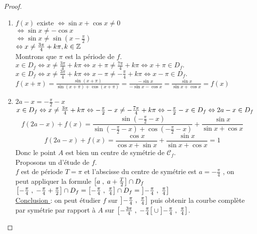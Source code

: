 \begin{proof}
\begin{enumerate}
\item $ f(x) $ existe    $\Leftrightarrow \sin x+\cos x \neq 0  $\\
 $\Leftrightarrow \sin x \neq -\cos x $\\
 $\Leftrightarrow \sin x \neq \sin (x- \frac{\pi}{2}) $\\
 $ \Leftrightarrow x\neq \frac{3\pi}{4}+ k\pi , k\in \mathbb{Z}$\\
 Montrons que $ \pi $ est la période de $ f. $\\
 $ x \in D_{f}\Leftrightarrow x\neq \frac{3\pi}{4}+ k\pi \Leftrightarrow x+\pi\neq \frac{7\pi}{4}+ k\pi \Leftrightarrow x+\pi\in D_{f}.$\\
  $ x \in D_{f}\Leftrightarrow x\neq \frac{3\pi}{4}+ k\pi \Leftrightarrow x-\pi\neq -\frac{\pi}{4}+ k\pi \Leftrightarrow x-\pi\in D_{f}.$\\
 $ f(x+\pi)=\frac{\sin (x+\pi) }{\sin (x+\pi)+\cos (x+\pi)}= \frac{-\sin x }{-\sin x-\cos x}=\frac{\sin x }{\sin x+\cos x}=f(x)$
 \item $ 2a-x=-\frac{\pi}{2}-x $\\
  $ x \in D_{f}\Leftrightarrow x\neq \frac{3\pi}{4}+ k\pi \Leftrightarrow -\frac{\pi}{2}-x \neq -\frac{7\pi}{4}+ k\pi \Leftrightarrow -\frac{\pi}{2}-x\in D_{f} \\\Leftrightarrow 2a-x\in D_{f}$
 $$ f(2a-x)+f(x)= \frac{\sin (-\frac{\pi}{2}-x ) }{\sin (-\frac{\pi}{2}-x )+\cos (-\frac{\pi}{2}-x )}+\frac{\sin x }{\sin x+\cos x} $$
 $$ f(2a-x)+f(x)= \frac{\cos x }{\cos x +\sin x }+\frac{\sin x }{\sin x+\cos x}=1 $$
 Donc le point $ A $ est bien un centre de symétrie de $ \mathcal{C}_{f} $.\\
 Proposons un d'étude   de $f. $\\
$ f $ est de période $ T= \pi$ et l'abscisse  du centre de symétrie est $ a=-\frac{\pi}{4}  $ , on peut appliquer la formule $ \left[a\;,\; a+\frac{T}{2}\right]\cap D_{f} $ \\
$ \left[-\frac{\pi}{4}\;,\; -\frac{\pi}{4}+\frac{\pi}{2}\right]\cap D_{f} =\left[-\frac{\pi}{4}\;,\; \frac{\pi}{4}\right]\cap D_{f}=\left]-\frac{\pi}{4} \;, \;\frac{\pi}{4}\right]$\\
\underline{Conclusion }: on peut étudier $ f $ sur $\left]-\frac{\pi}{4} \;, \;\frac{\pi}{4}\right]$ puis obtenir la courbe complète par symétrie par rapport à $ A $ sur $ \left[-\frac{3\pi}{4} \;,\; -\frac{\pi}{4}\right[\cup \left]-\frac{\pi}{4} \;, \;\frac{\pi}{4}\right] $.
 
 
\end{enumerate}
\end{proof}

